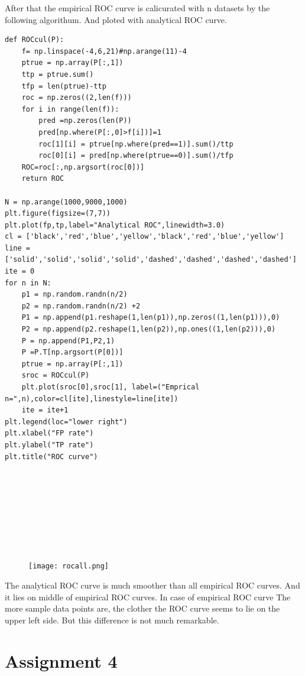\documentclass[a4paper,11pt]{article}
\begin{document}
After that the empirical ROC curve is calicurated with n datasets by the following algorithum. And ploted with analytical ROC curve.

\begin{verbatim}
def ROCcul(P):
    f= np.linspace(-4,6,21)#np.arange(11)-4
    ptrue = np.array(P[:,1])
    ttp = ptrue.sum()
    tfp = len(ptrue)-ttp
    roc = np.zeros((2,len(f)))
    for i in range(len(f)):
        pred =np.zeros(len(P))
        pred[np.where(P[:,0]>f[i])]=1
        roc[1][i] = ptrue[np.where(pred==1)].sum()/ttp
        roc[0][i] = pred[np.where(ptrue==0)].sum()/tfp
    ROC=roc[:,np.argsort(roc[0])]
    return ROC

N = np.arange(1000,9000,1000)
plt.figure(figsize=(7,7))
plt.plot(fp,tp,label="Analytical ROC",linewidth=3.0)
cl = ['black','red','blue','yellow','black','red','blue','yellow']
line = ['solid','solid','solid','solid','dashed','dashed','dashed','dashed']
ite = 0
for n in N:
    p1 = np.random.randn(n/2)
    p2 = np.random.randn(n/2) +2
    P1 = np.append(p1.reshape(1,len(p1)),np.zeros((1,len(p1))),0)
    P2 = np.append(p2.reshape(1,len(p2)),np.ones((1,len(p2))),0)
    P = np.append(P1,P2,1)
    P =P.T[np.argsort(P[0])]
    ptrue = np.array(P[:,1])
    sroc = ROCcul(P)
    plt.plot(sroc[0],sroc[1], label=("Emprical n=",n),color=cl[ite],linestyle=line[ite])
    ite = ite+1
plt.legend(loc="lower right")
plt.xlabel("FP rate")
plt.ylabel("TP rate")
plt.title("ROC curve")
\end{verbatim}

\begin{verbatim}








\end{verbatim}

\begin{figure}[htbp]
  \texttt{[image: rocall.png]}
\end{figure}

The analytical ROC curve is much smoother than all empirical ROC curves. And it lies on middle of empirical ROC curves. In case of empirical ROC curve The more sample data points are, the clother the ROC curve seems to lie on the upper left side. But this difference is not much remarkable.

	


\section*{Assignment 4}
\end{document}
